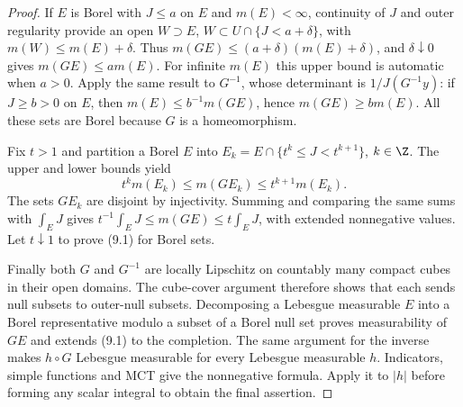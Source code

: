 \documentclass[11pt,oneside,openany]{book}
\theoremstyle{definition}
\theoremstyle{remark}
\begin{document}
\begin{proof}
If $E$ is Borel with $J\leq a$ on $E$ and $m(E)<\infty$, continuity of
$J$ and outer regularity provide an open
$W\supset E$, $W\subset U\cap\{J<a+\delta\}$, with
$m(W)\leq m(E)+\delta$. Thus
$m(GE)\leq(a+\delta)(m(E)+\delta)$, and $\delta\downarrow0$ gives
$m(GE)\leq a m(E)$. For infinite $m(E)$ this upper bound is automatic
when $a>0$. Apply the same result to $G^{-1}$, whose determinant is
$1/J(G^{-1}y)$: if $J\geq b>0$ on $E$, then
$m(E)\leq b^{-1}m(GE)$, hence $m(GE)\geq b m(E)$.
All these sets are Borel because $G$ is a homeomorphism.

Fix $t>1$ and partition a Borel $E$ into
$E_k=E\cap\{t^k\leq J<t^{k+1}\}$, $k\in\Z$.
The upper and lower bounds yield
\[
 t^k m(E_k)\leq m(GE_k)\leq t^{k+1}m(E_k).
\]
The sets $GE_k$ are disjoint by injectivity. Summing and comparing the
same sums with $\int_EJ$ gives
$t^{-1}\int_EJ\leq m(GE)\leq t\int_EJ$, with extended nonnegative
values. Let $t\downarrow1$ to prove (9.1) for Borel sets.

Finally both $G$ and $G^{-1}$ are locally Lipschitz on countably many
compact cubes in their open domains. The cube-cover argument therefore
shows that each sends null subsets to outer-null subsets. Decomposing a
Lebesgue measurable $E$ into a Borel representative modulo a subset of a
Borel null set proves measurability of $GE$ and extends (9.1) to the
completion. The same argument for the inverse makes $h\circ G$
Lebesgue measurable for every Lebesgue measurable $h$. Indicators, simple
functions and MCT give the nonnegative formula. Apply it to $|h|$ before
forming any scalar integral to obtain the final assertion.
\end{proof}
\end{document}

